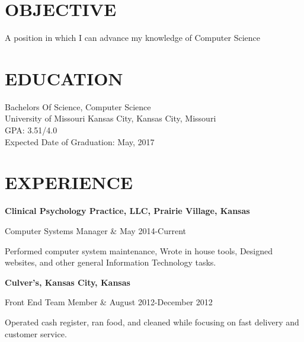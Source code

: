 \documentclass[margin,11pt]{res} %
\begin{document}

\address{ 5601 Lydia Avenue \\ Kansas City, Missouri 64112 \\
(913) 908-6148 \\ cdrm4@mail.umkc.edu \\}

\begin{resume}
 
\section{OBJECTIVE}  
A position in which I can advance my knowledge of Computer Science
 
\section{EDUCATION}       
 Bachelors Of Science, Computer Science  \\
                University of Missouri Kansas City, Kansas City, Missouri \\ 
                GPA: 3.51/4.0 \\
                Expected Date of Graduation: May, 2017
 
 
\section{EXPERIENCE}      

{\bf Clinical Psychology Practice, LLC, Prairie Village, Kansas} \\
                \begin{ncolumn}{2} %
                Computer Systems Manager &  May 2014-Current
                \end{ncolumn}
                Performed computer system maintenance, Wrote in house tools, Designed websites, and other general Information Technology tasks.
 
{\bf Culver's, Kansas City, Kansas} \\
                \begin{ncolumn}{2} %
                Front End Team Member     &      August 2012-December 2012 
                \end{ncolumn}
                Operated cash register, ran food, and cleaned while focusing on fast delivery and customer service.
 

\end{resume}
\end{document}
